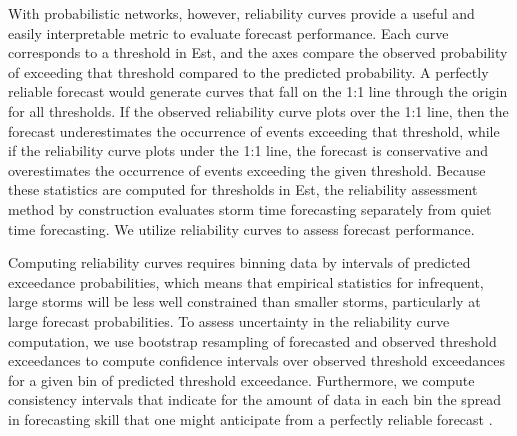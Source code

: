 With probabilistic networks, however, reliability curves provide a useful and easily interpretable metric to evaluate forecast performance. Each curve corresponds to a threshold in Est, and the axes compare the observed probability of exceeding that threshold compared to the predicted probability. A perfectly reliable forecast would generate curves that fall on the 1:1 line through the origin for all thresholds. If the observed reliability curve plots over the 1:1 line, then the forecast underestimates the occurrence of events exceeding that threshold, while if the reliability curve plots under the 1:1 line, the forecast is conservative and overestimates the occurrence of events exceeding the given threshold. Because these statistics are computed for thresholds in Est, the reliability assessment method by construction evaluates storm time forecasting separately from quiet time forecasting. We utilize reliability curves to assess forecast performance. 

Computing reliability curves requires binning data by intervals of predicted exceedance probabilities, which means that empirical statistics for infrequent, large storms will be less well constrained than smaller storms, particularly at large forecast probabilities. To assess uncertainty in the reliability curve computation, we use bootstrap resampling of forecasted and observed threshold exceedances to compute confidence intervals over observed threshold exceedances for a given bin of predicted threshold exceedance. Furthermore, we compute consistency intervals that indicate for the amount of data in each bin the spread in forecasting skill that one might anticipate from a perfectly reliable forecast \citep{Brocker2007}.